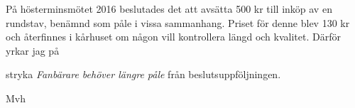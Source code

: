 \documentclass[../_main/handlingar.tex]{subfiles}
\begin{document}
På hösterminsmötet 2016 beslutades det att avsätta 500 kr till inköp av en rundstav, benämnd som påle i vissa sammanhang. Priset för denne blev 130 kr och återfinnes i kårhuset om någon vill kontrollera längd och kvalitet.
Därför yrkar jag på
\begin{attsatser}
    \att stryka \emph{Fanbärare behöver längre påle} från beslutsuppföljningen.
\end{attsatser}

Mvh

\begin{signatures}{1}
    \ist
	\signature{Emil Harvig}{}
\end{signatures}
\end{document}
